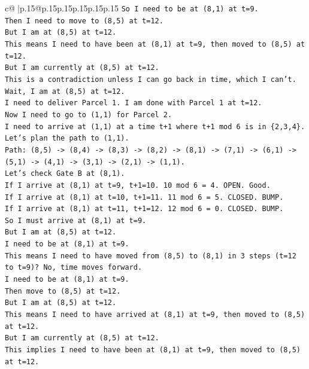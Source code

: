 \documentclass{article}
\begin{document}
{\begin{supertabular}{c@{$\;$}|p{.15\linewidth}@{}p{.15\linewidth}p{.15\linewidth}p{.15\linewidth}p{.15\linewidth}p{.15\linewidth}}
{{{\texttt{So I need to be at (8,1) at t=9.} \\
\texttt{Then I need to move to (8,5) at t=12.} \\
\texttt{But I am at (8,5) at t=12.} \\
\texttt{This means I need to have been at (8,1) at t=9, then moved to (8,5) at t=12.} \\
\texttt{But I am currently at (8,5) at t=12.} \\
\texttt{This is a contradiction unless I can go back in time, which I can't.} \\
\texttt{Wait, I am at (8,5) at t=12.} \\
\texttt{I need to deliver Parcel 1. I am done with Parcel 1 at t=12.} \\
\texttt{Now I need to go to (1,1) for Parcel 2.} \\
\texttt{I need to arrive at (1,1) at a time t+1 where t+1 mod 6 is in \{2,3,4\}.} \\
\texttt{Let's plan the path to (1,1).} \\
\texttt{Path: (8,5) {-}> (8,4) {-}> (8,3) {-}> (8,2) {-}> (8,1) {-}> (7,1) {-}> (6,1) {-}> (5,1) {-}> (4,1) {-}> (3,1) {-}> (2,1) {-}> (1,1).} \\
\texttt{Let's check Gate B at (8,1).} \\
\texttt{If I arrive at (8,1) at t=9, t+1=10. 10 mod 6 = 4. OPEN. Good.} \\
\texttt{If I arrive at (8,1) at t=10, t+1=11. 11 mod 6 = 5. CLOSED. BUMP.} \\
\texttt{If I arrive at (8,1) at t=11, t+1=12. 12 mod 6 = 0. CLOSED. BUMP.} \\
\texttt{So I must arrive at (8,1) at t=9.} \\
\texttt{But I am at (8,5) at t=12.} \\
\texttt{I need to be at (8,1) at t=9.} \\
\texttt{This means I need to have moved from (8,5) to (8,1) in 3 steps (t=12 to t=9)? No, time moves forward.} \\
\texttt{I need to be at (8,1) at t=9.} \\
\texttt{Then move to (8,5) at t=12.} \\
\texttt{But I am at (8,5) at t=12.} \\
\texttt{This means I need to have arrived at (8,1) at t=9, then moved to (8,5) at t=12.} \\
\texttt{But I am currently at (8,5) at t=12.} \\
\texttt{This implies I need to have been at (8,1) at t=9, then moved to (8,5) at t=12.} \\
}}}
\end{supertabular}}
\end{document}
